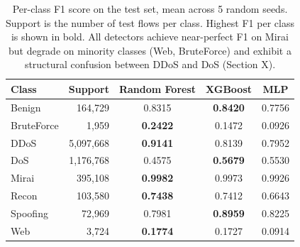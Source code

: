 \begin{table}[t]
\centering
\caption{Per-class F1 score on the test set, mean across 5 random seeds. Support is the number of test flows per class. Highest F1 per class is shown in bold. All detectors achieve near-perfect F1 on Mirai but degrade on minority classes (Web, BruteForce) and exhibit a structural confusion between DDoS and DoS (Section X).}
\label{tab:per_class_f1}
\small
\begin{tabular}{lrccc}
\toprule
Class & Support & Random Forest & XGBoost & MLP \\
\midrule
Benign & 164,729 & 0.8315 & \textbf{0.8420} & 0.7756 \\
BruteForce & 1,959 & \textbf{0.2422} & 0.1472 & 0.0926 \\
DDoS & 5,097,668 & \textbf{0.9141} & 0.8139 & 0.7952 \\
DoS & 1,176,768 & 0.4575 & \textbf{0.5679} & 0.5530 \\
Mirai & 395,108 & \textbf{0.9982} & 0.9973 & 0.9926 \\
Recon & 103,580 & \textbf{0.7438} & 0.7412 & 0.6643 \\
Spoofing & 72,969 & 0.7981 & \textbf{0.8959} & 0.8225 \\
Web & 3,724 & \textbf{0.1774} & 0.1727 & 0.0914 \\
\bottomrule
\end{tabular}
\end{table}